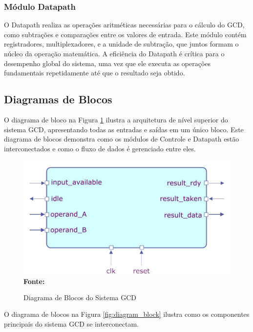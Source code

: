 \documentclass[a4paper,11pt]{article} %
\begin{document}
\subsubsection{Módulo Datapath}
O Datapath realiza as operações aritméticas necessárias para o cálculo do GCD, 
como subtrações e comparações entre os valores de entrada. 
Este módulo contém registradores, multiplexadores, e a unidade de subtração, 
que juntos formam o núcleo da operação matemática. 
A eficiência do Datapath é crítica para o desempenho global do sistema, 
uma vez que ele executa as operações fundamentais repetidamente até 
que o resultado seja obtido.


\subsection{Diagramas de Blocos}
O diagrama de bloco na Figura \ref{fig:top_level} 
ilustra a arquitetura de nível superior do sistema GCD, 
apresentando todas as entradas e saídas em um único bloco. 
Este diagrama de blocos demonstra como os módulos de 
Controle e Datapath estão interconectados e como o fluxo de dados é gerenciado entre eles. 

\begin{figure}[ht]
    \centering
    \caption{Diagrama de Blocos do Sistema GCD}
    \includegraphics[width=15cm,angle=0]{imgs/diagram_block_top_level.png}
    \\\textbf{Fonte:} \cite{cse_taylor_michael}
    \label{fig:top_level}
\end{figure}

O diagrama de blocos na Figura \ref{fig:diagram_block} ilustra como os componentes principais 
do sistema GCD se interconectam. 
\end{document}
